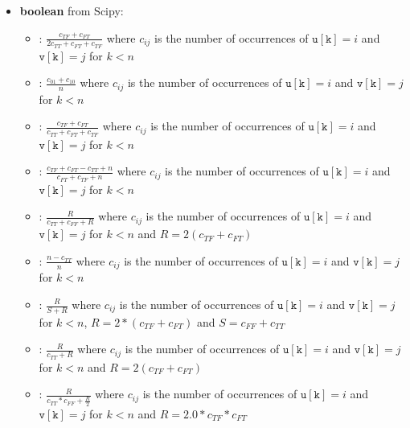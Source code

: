 \begin{itemize}
  \item \textbf{boolean} from Scipy:
    \begin{itemize}
      \item {}: $\frac{c_{TF} + c_{FT}}{2c_{TT} + c_{FT} + c_{TF}}$
        where $c_{ij}$ is the number of occurrences of $\mathtt{u[k]} = i$ and $\mathtt{v[k]} = j$ for $k < n$
      \item {}: $\frac{c_{01} + c_{10}}{n}$
        where $c_{ij}$ is the number of occurrences of $\mathtt{u[k]} = i$ and $\mathtt{v[k]} = j$ for $k < n$
      \item {}: $\frac{c_{TF} + c_{FT}}{c_{TT} + c_{FT} + c_{TF}}$
        where $c_{ij}$ is the number of occurrences of $\mathtt{u[k]} = i$ and $\mathtt{v[k]} = j$ for $k < n$
      \item {}: $\frac{c_{TF} + c_{FT} - c_{TT} + n}{c_{FT} + c_{TF} + n}$
        where $c_{ij}$ is the number of occurrences of $\mathtt{u[k]} = i$ and $\mathtt{v[k]} = j$ for $k < n$
      \item {}: $\frac{R}{c_{TT} + c_{FF} + R}$
        where $c_{ij}$ is the number of occurrences of $\mathtt{u[k]} = i$ and $\mathtt{v[k]} = j$
        for $k < n$ and $R = 2(c_{TF} + c_{FT})$
      \item {}: $\frac{n - c_{TT}}{n}$
        where $c_{ij}$ is the number of occurrences of $\mathtt{u[k]} = i$ and $\mathtt{v[k]} = j$ for $k < n$
      \item {}: $\frac{R}{S + R}$
        where $c_{ij}$ is the number of occurrences of $\mathtt{u[k]} = i$ and $\mathtt{v[k]} = j$ for
        $k < n$, $R = 2 * (c_{TF} + c_{FT})$ and $S = c_{FF} + c_{TT}$
      \item {}: $\frac{R}{c_{TT} + R}$
        where $c_{ij}$ is the number of occurrences of $\mathtt{u[k]} = i$ and $\mathtt{v[k]} = j$
        for $k < n$ and $R = 2(c_{TF} + c_{FT})$
      \item {}: $\frac{R}{c_{TT} * c_{FF} + \frac{R}{2}}$
        where $c_{ij}$ is the number of occurrences of $\mathtt{u[k]} = i$ and $\mathtt{v[k]} = j$ for
        $k < n$ and $R = 2.0 * c_{TF} * c_{FT}$
    \end{itemize}
\end{itemize}

